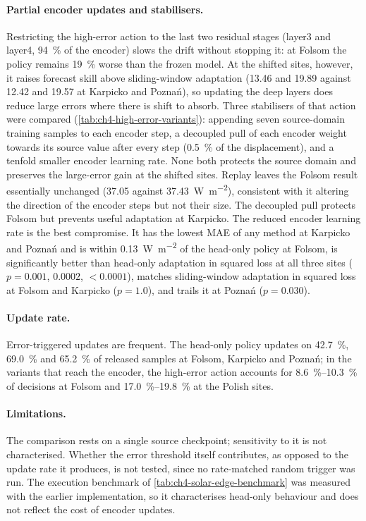 \paragraph{Partial encoder updates and stabilisers.} Restricting the high-error action to the
last two residual stages (layer3 and layer4, \SI{94}{\percent} of the encoder) slows the drift
without stopping it: at Folsom the policy remains \SI{19}{\percent} worse than the frozen model.
At the shifted sites, however, it raises forecast skill above sliding-window adaptation (13.46 and
19.89 against 12.42 and 19.57 at Karpicko and Poznań), so updating the deep layers does reduce
large errors where there is shift to absorb.
Three stabilisers of that action were compared (\cref{tab:ch4-high-error-variants}): appending
seven source-domain training samples to each encoder step, a decoupled pull of each encoder weight
towards its source value after every step (\SI{0.5}{\percent} of the displacement), and a
tenfold smaller encoder learning rate. None both protects the source domain and preserves the
large-error gain at the shifted sites. Replay leaves the Folsom result essentially unchanged (\num{37.05} against
\SI{37.43}{\watt\per\square\meter}), consistent with it altering the direction of the encoder
steps but not their size. The decoupled pull protects Folsom
but prevents useful adaptation at Karpicko. The reduced encoder learning rate is the best
compromise. It has the lowest MAE of any method at Karpicko and Poznań and is within
\SI{0.13}{\watt\per\square\meter} of the head-only policy at Folsom, is significantly better than
head-only adaptation in squared loss at all three sites ($p=0.001$, $0.0002$, $<0.0001$), matches
sliding-window adaptation in squared loss at Folsom and Karpicko ($p=1.0$), and trails it at
Poznań ($p=0.030$).

\paragraph{Update rate.} Error-triggered updates are frequent. The head-only policy updates on
\SI{42.7}{\percent}, \SI{69.0}{\percent} and \SI{65.2}{\percent} of released samples at Folsom,
Karpicko and Poznań; in the variants that reach the encoder, the high-error action accounts for
\SIrange{8.6}{10.3}{\percent} of decisions at Folsom and \SIrange{17.0}{19.8}{\percent} at the
Polish sites.

\paragraph{Limitations.} The comparison rests on a single source checkpoint; sensitivity to it
is not characterised. Whether the error threshold itself contributes, as opposed to the update rate
it produces, is not tested, since no rate-matched random trigger was run. The execution benchmark
of \cref{tab:ch4-solar-edge-benchmark} was measured with the earlier implementation, so it
characterises head-only behaviour and does not reflect the cost of encoder updates.

